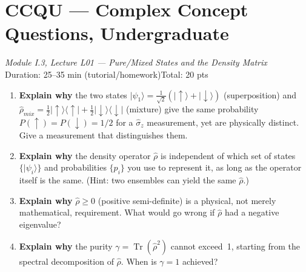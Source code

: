 \documentclass[11pt,a4paper]{article}
\begin{document}
\section*{CCQU --- Complex Concept Questions, Undergraduate}
\begin{center}
  \textit{Module I.3, Lecture L01 --- Pure/Mixed States and the Density Matrix}\\[4pt]
  \quad{}
  \qquad Duration: 25--35 min (tutorial/homework)\qquad Total: 20 pts
\end{center}


\bigskip

\begin{tcolorbox}[ugconceptbox, title={Part I --- ``Explain Why'' \hfill\normalfont 4 $\times$ 2 pts = 8 pts}]

\begin{enumerate}[leftmargin=1.8em, label=\textbf{Q\arabic*.}, itemsep=14pt]

\item {}
  \textbf{Explain why} the two states
  $|\psi_1\rangle=\tfrac{1}{\sqrt{2}}(|\uparrow\rangle+|\downarrow\rangle)$
  (superposition) and
  $\hat{\rho}_{mix}=\tfrac{1}{2}|\uparrow\rangle\langle\uparrow|+\tfrac{1}{2}|\downarrow\rangle\langle\downarrow|$
  (mixture) give the same probability $P(\uparrow)=P(\downarrow)=1/2$ for a
  $\hat{\sigma}_z$ measurement, yet are physically distinct.
  Give a measurement that distinguishes them.

  \vspace{3cm}

\item {}
  \textbf{Explain why} the density operator $\hat{\rho}$ is independent of which
  set of states $\{|\psi_i\rangle\}$ and probabilities $\{p_i\}$ you use to
  represent it, as long as the operator itself is the same.
  (Hint: two ensembles can yield the same $\hat{\rho}$.)

  \vspace{3cm}

\item {}
  \textbf{Explain why} $\hat{\rho}\ge 0$ (positive semi-definite) is a physical,
  not merely mathematical, requirement.
  What would go wrong if $\hat{\rho}$ had a negative eigenvalue?

  \vspace{3cm}

\item {}
  \textbf{Explain why} the purity $\gamma=\operatorname{Tr}(\hat{\rho}^2)$
  cannot exceed~1, starting from the spectral decomposition of $\hat{\rho}$.
  When is $\gamma=1$ achieved?

  \vspace{3cm}

\end{enumerate}
\end{tcolorbox}
\end{document}
